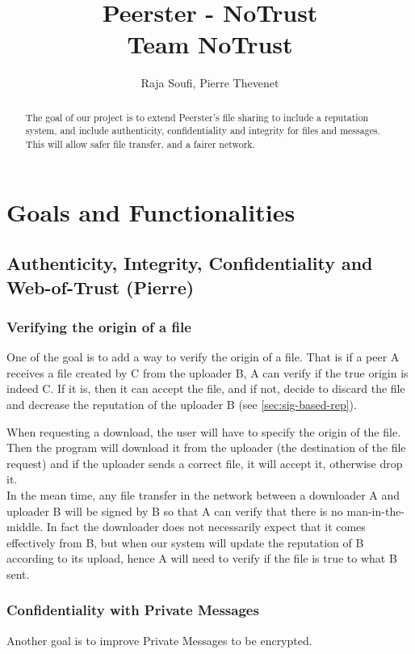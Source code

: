 \documentclass[]{article}
\title{Peerster - NoTrust\\
\large Team NoTrust}
\author{Raja Soufi, Pierre Thevenet}
\begin{document}
\maketitle

\begin{abstract}
The goal of our project is to extend Peerster's file sharing to include a reputation system, and include authenticity, confidentiality and integrity for files and messages. This will allow safer file transfer, and a fairer network.
\end{abstract}

\section{Goals and Functionalities}


\subsection{Authenticity, Integrity, Confidentiality and Web-of-Trust (Pierre)}

\subsubsection{Verifying the origin of a file}
\label{sec:goals-funcs-auth-integrity}
One of the goal is to add a way to verify the origin of a file. That is if a peer A receives a file created by C from the uploader B, A can verify if the true origin is indeed C. If it is, then it can accept the file, and if not, decide to discard the file and decrease the reputation of the uploader B (see \ref{sec:sig-based-rep}).

When requesting a download, the user will have to specify the origin of the file. Then the program will download it from the uploader (the destination of the file request) and if the uploader sends a correct file, it will accept it, otherwise drop it. \\

In the mean time, any file transfer in the network between a downloader A and uploader B will be signed by B so that A can verify that there is no man-in-the-middle. In fact the downloader does not necessarily expect that it comes effectively from B, but when our system will update the reputation of B according to its upload, hence A will need to verify if the file is true to what B sent. 

\subsubsection{Confidentiality with Private Messages}
Another goal is to improve Private Messages to be encrypted.
\end{document}
